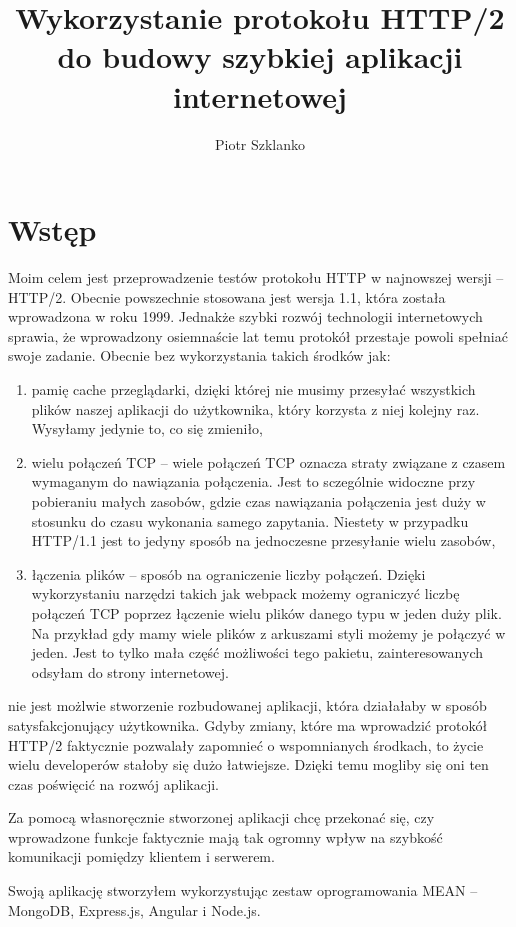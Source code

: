 \documentclass[a4paper,12pt,twoside,openany]{report}
\title{Wykorzystanie protokołu HTTP/2 do budowy szybkiej aplikacji internetowej}
\author{Piotr Szklanko}
\begin{document}
\maketitle

\chapter{Wstęp}
Moim celem jest przeprowadzenie testów protokołu HTTP w najnowszej wersji -- HTTP/2.
Obecnie powszechnie stosowana jest wersja 1.1, która została wprowadzona w roku 1999.
Jednakże szybki rozwój technologii internetowych sprawia, że wprowadzony osiemnaście lat temu protokół przestaje powoli spełniać swoje zadanie.
Obecnie bez wykorzystania takich środków jak:
\begin{enumerate}
	\item pamię cache przeglądarki, dzięki której nie musimy przesyłać wszystkich plików naszej aplikacji do użytkownika, który korzysta z niej kolejny raz. 
	Wysyłamy jedynie to, co się zmieniło,
	\item wielu połączeń TCP -- wiele połączeń TCP oznacza straty związane z czasem wymaganym do nawiązania połączenia.
	Jest to sczególnie widoczne przy pobieraniu małych zasobów, gdzie czas nawiązania połączenia jest duży w stosunku do czasu wykonania samego zapytania.
	Niestety w przypadku HTTP/1.1 jest to jedyny sposób na jednoczesne przesyłanie wielu zasobów,
	\item łączenia plików -- sposób na ograniczenie liczby połączeń.
	Dzięki wykorzystaniu narzędzi takich jak webpack możemy ograniczyć liczbę połączeń TCP poprzez łączenie wielu plików danego typu w jeden duży plik.
	Na przykład gdy mamy wiele plików z arkuszami styli możemy je połączyć w jeden.
	Jest to tylko mała część możliwości tego pakietu, zainteresowanych odsyłam do strony internetowej\cite{webpack}.
\end{enumerate}
nie jest możlwie stworzenie rozbudowanej aplikacji, która działałaby w sposób satysfakcjonujący użytkownika.
Gdyby zmiany, które ma wprowadzić protokół HTTP/2 faktycznie pozwalały zapomnieć o wspomnianych środkach, to życie wielu developerów stałoby się dużo łatwiejsze.
Dzięki temu mogliby się oni ten czas poświęcić na rozwój aplikacji.

Za pomocą własnoręcznie stworzonej aplikacji chcę przekonać się, czy wprowadzone funkcje faktycznie mają tak ogromny wpływ na szybkość komunikacji pomiędzy klientem i serwerem.

Swoją aplikację stworzyłem wykorzystując zestaw oprogramowania MEAN -- MongoDB, Express.js, Angular i Node.js.
\end{document}
